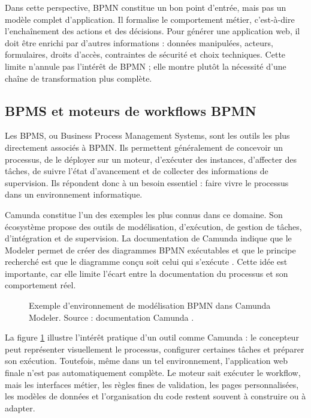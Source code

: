 Dans cette perspective, BPMN constitue un bon point d'entrée, mais pas
un modèle complet d'application. Il formalise le comportement métier,
c'est-à-dire l'enchaînement des actions et des décisions. Pour générer
une application web, il doit être enrichi par d'autres informations :
données manipulées, acteurs, formulaires, droits d'accès, contraintes de
sécurité et choix techniques. Cette limite n'annule pas l'intérêt de
BPMN ; elle montre plutôt la nécessité d'une chaîne de transformation
plus complète.

\subsection{BPMS et moteurs de workflows BPMN}

Les BPMS, ou Business Process Management Systems, sont les outils les
plus directement associés à BPMN. Ils permettent généralement de
concevoir un processus, de le déployer sur un moteur, d'exécuter des
instances, d'affecter des tâches, de suivre l'état d'avancement et de
collecter des informations de supervision. Ils répondent donc à un
besoin essentiel : faire vivre le processus dans un environnement
informatique.

Camunda constitue l'un des exemples les plus connus dans ce domaine. Son
écosystème propose des outils de modélisation, d'exécution, de gestion
de tâches, d'intégration et de supervision. La documentation de Camunda
indique que le Modeler permet de créer des diagrammes BPMN exécutables
et que le principe recherché est que le diagramme conçu soit celui qui
s'exécute \cite{camunda2026modeler}. Cette idée est importante, car elle limite l'écart
entre la documentation du processus et son comportement réel.

\begin{figure}[H]
\centering
{}
\caption{Exemple d'environnement de modélisation BPMN dans Camunda
Modeler. Source : documentation Camunda \cite{camunda2026modeler}.}
\label{fig:camunda-modeler}
\end{figure}

La figure \ref{fig:camunda-modeler} illustre l'intérêt pratique d'un outil comme Camunda : le
concepteur peut représenter visuellement le processus, configurer
certaines tâches et préparer son exécution. Toutefois, même dans un tel
environnement, l'application web finale n'est pas automatiquement
complète. Le moteur sait exécuter le workflow, mais les interfaces
métier, les règles fines de validation, les pages personnalisées, les
modèles de données et l'organisation du code restent souvent à
construire ou à adapter.

